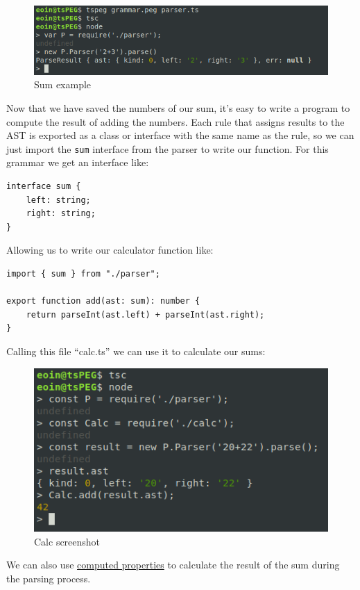 \begin{figure}[ht]
\centering
    \includegraphics[scale=0.7]{src/app1assets/sum.png}
\caption{Sum example}
\end{figure}

Now that we have saved the numbers of our sum, it's easy to write a
program to compute the result of adding the numbers. Each rule that
assigns results to the AST is exported as a class or interface with the
same name as the rule, so we can just import the \texttt{sum} interface
from the parser to write our function. For this grammar we get an
interface like:

\begin{verbatim}
interface sum {
    left: string;
    right: string;
}
\end{verbatim}

Allowing us to write our calculator function like:

\begin{verbatim}
import { sum } from "./parser";

export function add(ast: sum): number {
    return parseInt(ast.left) + parseInt(ast.right);
}
\end{verbatim}

Calling this file ``calc.ts'' we can use it to calculate our sums:

\begin{figure}[ht]
\centering
\includegraphics{src/app1assets/calc.png}
\caption{Calc screenshot}
\end{figure}

We can also use \protect\hyperlink{computed-properties}{computed
properties} to calculate the result of the sum during the parsing
process.

